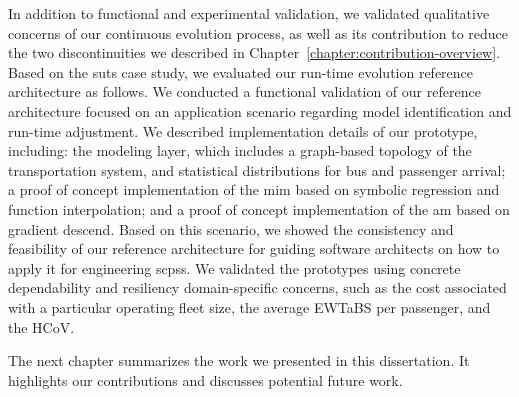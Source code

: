 
In addition to functional and experimental validation, we validated qualitative concerns of our continuous evolution process, as well as its contribution to reduce the two discontinuities we described in Chapter~\ref{chapter:contribution-overview}. Based on the \gls{suts} case study, we evaluated our run-time evolution reference architecture as follows. We conducted a functional validation of our reference architecture focused on an application scenario regarding model identification and run-time adjustment. We described implementation details of our prototype, including: the modeling layer, which includes a graph-based topology of the transportation system, and statistical distributions for bus and passenger arrival; a proof of concept implementation of the \gls{mim} based on symbolic regression and function interpolation; and a proof of concept implementation of the \gls{am} based on gradient descend. Based on this scenario, we showed the consistency and feasibility of our reference architecture for guiding software architects on how to apply it for engineering \glspl{scps}. We validated the prototypes using concrete dependability and resiliency domain-specific concerns, such as the cost associated with a particular operating fleet size, the average \gls{EWTaBS} per passenger, and the \gls{HCoV}.

The next chapter summarizes the work we presented in this dissertation. It highlights our contributions and discusses potential future work.
